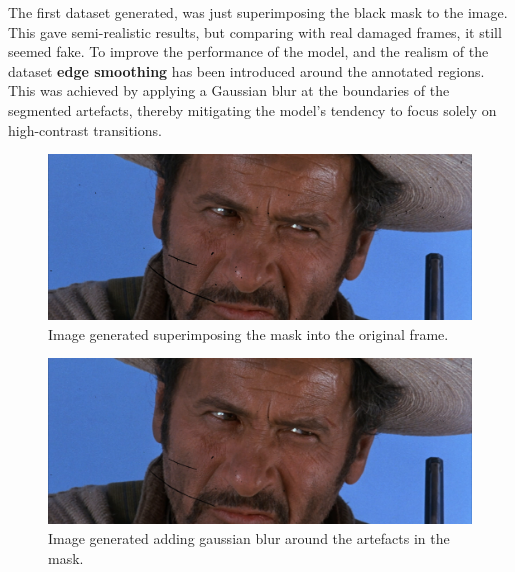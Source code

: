 \documentclass[openany, 12pt]{article}
\begin{document}
	The first dataset generated, was just superimposing the black mask to the image. This gave semi-realistic results, but comparing with real damaged frames, it still seemed fake. To improve the performance of the model, and the realism of the dataset \textbf{edge smoothing} has been introduced around the annotated regions. This was achieved by applying a Gaussian blur at the boundaries of the segmented artefacts, thereby mitigating the model's tendency to focus solely on high-contrast transitions.\\
	\begin{figure}[h!]
		\centering
		\includegraphics[width=0.7\linewidth]{images/image_binary.png}
		\caption{\smaller Image generated superimposing the mask into the original frame.} 
	\end{figure}
	\begin{figure}[h!]
		\centering
		\includegraphics[width=0.7\linewidth]{images/image_blur.png}
		\caption{\smaller Image generated adding gaussian blur around the artefacts in the mask.} 
	\end{figure}\\
\end{document}
